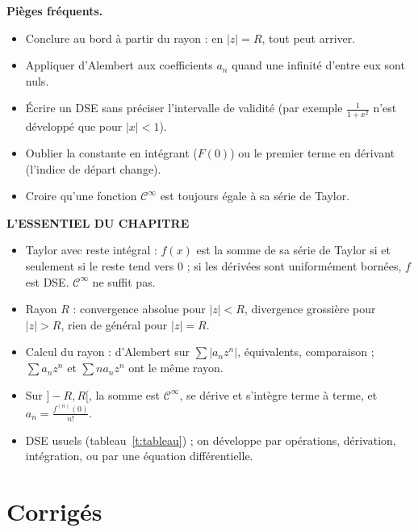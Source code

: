 \documentclass[a4paper,11pt]{article}
\numberwithin{equation}{section}
\numberwithin{figure}{section}
\numberwithin{table}{section}
\theoremstyle{enonce}
\theoremstyle{exemple}
\theoremstyle{remarque}
\newenvironment{essentiel}{\par\needspace{12\baselineskip}\vspace{1.5em}%
  \begin{tcolorbox}[enhanced,unbreakable,colback=white,colframe=white,boxrule=0pt,arc=0pt,
   borderline north={1.4pt}{0pt}{Ocre},left=2pt,right=2pt,top=8pt,bottom=4pt]
  {\sffamily\bfseries\color{Ocre}L'ESSENTIEL DU CHAPITRE}\par\medskip}{\end{tcolorbox}}
\begin{document}
\begin{attention}\textbf{Pièges fréquents.}
\begin{itemize}[leftmargin=1.1em]
\item Conclure au bord à partir du rayon : en $|z|=R$, tout peut arriver.
\item Appliquer d'Alembert aux coefficients $a_n$ quand une infinité d'entre eux sont nuls.
\item Écrire un DSE sans préciser l'intervalle de validité (par exemple $\frac1{1+x^2}$ n'est développé que pour $|x|<1$).
\item Oublier la constante en intégrant ($F(0)$) ou le premier terme en dérivant (l'indice de départ change).
\item Croire qu'une fonction $\mathcal C^\infty$ est toujours égale à sa série de Taylor.
\end{itemize}
\end{attention}

\begin{essentiel}
\begin{itemize}[leftmargin=1.1em,itemsep=2pt]
\item Taylor avec reste intégral : $f(x)$ est la somme de sa série de Taylor si et seulement si le reste tend vers $0$ ; si les dérivées sont uniformément bornées, $f$ est DSE. $\mathcal C^\infty$ ne suffit pas.
\item Rayon $R$ : convergence absolue pour $|z|<R$, divergence grossière pour $|z|>R$, rien de général pour $|z|=R$.
\item Calcul du rayon : d'Alembert sur $\sum|a_nz^n|$, équivalents, comparaison ; $\sum a_nz^n$ et $\sum na_nz^n$ ont le même rayon.
\item Sur $]-R,R[$, la somme est $\mathcal C^\infty$, se dérive et s'intègre terme à terme, et $a_n=\frac{f^{(n)}(0)}{n!}$.
\item DSE usuels (tableau~\ref{t:tableau}) ; on développe par opérations, dérivation, intégration, ou par une équation différentielle.
\end{itemize}
\end{essentiel}

\clearpage
\renewcommand{\ongletcouleur}{Ocre}
\section{Corrigés}\label{sec:corriges-se}
\end{document}
